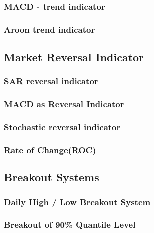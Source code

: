 \subsubsection{MACD - trend indicator}

\label{appA:macd_xov}

\subsubsection{Aroon trend indicator}
\label{appA:aroon}


\subsection{Market Reversal Indicator}
\subsubsection{SAR reversal indicator}
\label{appA:sar}


\subsubsection{MACD as Reversal Indicator}
\label{appA:macd_ob}

\subsubsection{Stochastic reversal indicator}
\label{appA:stoch}


\subsubsection{Rate of Change(ROC)}
\label{appA:roc}


\subsection{Breakout Systems}
\subsubsection{Daily High / Low Breakout System}
\label{appA:bout_sys}


\subsubsection{Breakout of 90\% Quantile Level}
\label{appA:bout_Quant90}


